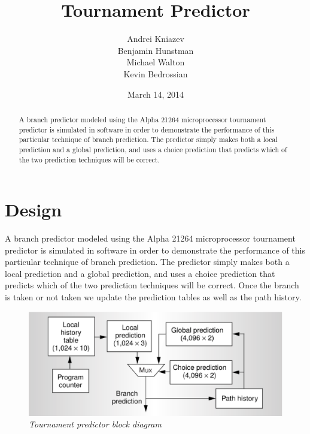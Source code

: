 \documentclass[]{report}   %
\begin{document}
\raggedright{}  %

\title{Tournament Predictor}   %
\author{Andrei Kniazev\\
  Benjamin Hunstman\\
  Michael Walton\\
  Kevin Bedrossian\\
}         %
\date{March 14, 2014}    %
\maketitle

\begin{abstract}
  A branch predictor modeled using the Alpha 21264 microprocessor tournament predictor is simulated in software in order to demonstrate the performance of this particular technique of branch prediction.
  The predictor simply makes both a local prediction and a global prediction, and uses a choice prediction that predicts which of the two prediction techniques will be correct.
\end{abstract}

\tableofcontents

\chapter{Design}
A branch predictor modeled using the Alpha 21264 microprocessor tournament predictor is simulated in software in order to demonstrate the performance of this particular technique of branch prediction.
The predictor simply makes both a local prediction and a global prediction, and uses a choice prediction that predicts which of the two prediction techniques will be correct.
Once the branch is taken or not taken we update the prediction tables as well as the path history.

\begin{figure}
\begin{center}
  \includegraphics[width=4.5in]{block_diagram.eps}
\end{center}

\caption*{\textit{Tournament predictor block diagram\cite{kessler}}}
\label{block-diagram}
\end{figure}
\end{document}
